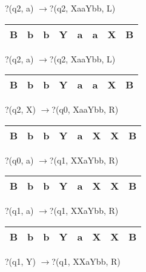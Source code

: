 ?(q2, a) $\to $?(q2, XaaYbb, L)

\noindent 

\begin{tabular}{|p{0.2in}|p{0.2in}|p{0.2in}|p{0.2in}|p{0.2in}|p{0.2in}|p{0.2in}|p{0.2in}|} \hline 
B & b & b & Y & a & a & X & B \\ \hline 
\end{tabular}

?(q2, a) $\to $?(q2, XaaYbb, L)

\noindent 

\begin{tabular}{|p{0.2in}|p{0.2in}|p{0.2in}|p{0.2in}|p{0.2in}|p{0.2in}|p{0.2in}|p{0.2in}|} \hline 
B & b & b & Y & a & a & X & B \\ \hline 
\end{tabular}

?(q2, X) $\to $?(q0, XaaYbb, R)

\noindent 

\begin{tabular}{|p{0.2in}|p{0.2in}|p{0.2in}|p{0.2in}|p{0.2in}|p{0.2in}|p{0.2in}|p{0.2in}|} \hline 
B & b & b & Y & a & X & X & B \\ \hline 
\end{tabular}

?(q0, a) $\to $?(q1, XXaYbb, R)

\noindent 

\begin{tabular}{|p{0.2in}|p{0.2in}|p{0.2in}|p{0.2in}|p{0.2in}|p{0.2in}|p{0.2in}|p{0.2in}|} \hline 
B & b & b & Y & a & X & X & B \\ \hline 
\end{tabular}

?(q1, a) $\to $?(q1, XXaYbb, R)

\noindent 

\begin{tabular}{|p{0.2in}|p{0.2in}|p{0.2in}|p{0.2in}|p{0.2in}|p{0.2in}|p{0.2in}|p{0.2in}|} \hline 
B & b & b & Y & a & X & X & B \\ \hline 
\end{tabular}

?(q1, Y) $\to $?(q1, XXaYbb, R)

\noindent 

\noindent 

\noindent 

\noindent 

\noindent 

\noindent 

\noindent 

